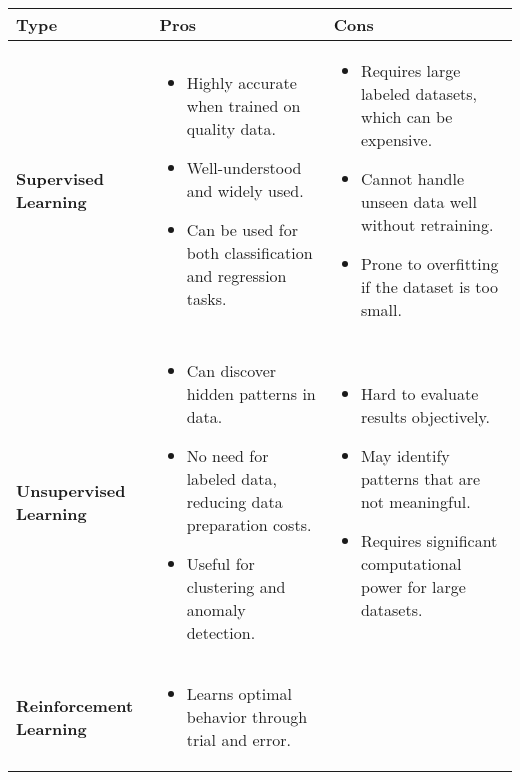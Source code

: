 \begin{table}[H]      
      \begin{tabular}{| m{3.5cm} | m{5cm} | m{5cm} |}
            \hline
            \textbf{Type} & \textbf{Pros} & \textbf{Cons} \\ 
            \hline
            \textbf{Supervised Learning} & 
            \begin{itemize}
                  \item Highly accurate when trained on quality data.
                  \item Well-understood and widely used.
                  \item Can be used for both classification and regression tasks.
            \end{itemize} & 
            \begin{itemize}
                  \item Requires large labeled datasets, which can be expensive.
                  \item Cannot handle unseen data well without retraining.
                  \item Prone to overfitting if the dataset is too small.
            \end{itemize} \\ 
            \hline
            \textbf{Unsupervised Learning} & 
            \begin{itemize}
                  \item Can discover hidden patterns in data.
                  \item No need for labeled data, reducing data preparation costs.
                  \item Useful for clustering and anomaly detection.
            \end{itemize} & 
            \begin{itemize}
                  \item Hard to evaluate results objectively.
                  \item May identify patterns that are not meaningful.
                  \item Requires significant computational power for large datasets.
            \end{itemize} \\ 
            \hline
            \textbf{Reinforcement Learning} & 
            \begin{itemize}
                  \item Learns optimal behavior through trial and error.

\end{itemize}
\end{tabular}
\end{table}
